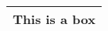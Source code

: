 \documentclass{article}
\begin{document}
\begin{center}
    \begin{tabular}{|c|}
        \hline
        This is a box\\
        \hline
    \end{tabular}
\end{center}
\end{document}
